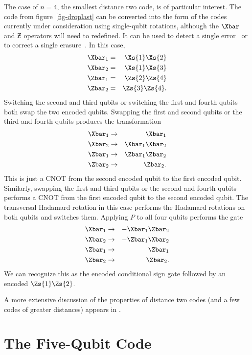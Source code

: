 The case of $n=4$, the smallest distance two code, is of particular interest.
The code from figure~\ref{fig-droplast} can be converted into the form of
the codes currently under consideration using single-qubit rotations,
although the $\Xbar$ and $\Zbar$ operators will need to redefined.  It
can be used to detect a single error~\cite{vaidman} or to correct a single
erasure~\cite{grassl}.  In this case,
\begin{eqnarray}
	\Xbar_1 & = & \Xs{1} \Xs{2} \nonumber \\
	\Xbar_2 & = & \Xs{1} \Xs{3} \nonumber \\
	\Zbar_1 & = & \Zs{2} \Zs{4} \\
	\Zbar_2 & = & \Zs{3} \Zs{4}. \nonumber
\end{eqnarray}
Switching the second and third qubits or switching the first and fourth qubits
both swap the two encoded qubits.  Swapping the first and second qubits or the
third and fourth qubits produces the transformation
\begin{eqnarray}
	\Xbar_1 & \rightarrow & \Xbar_1 \nonumber \\
	\Xbar_2 & \rightarrow & \Xbar_1 \Xbar_2 \nonumber \\
	\Zbar_1 & \rightarrow & \Zbar_1 \Zbar_2 \\
	\Zbar_2 & \rightarrow & \Zbar_2. \nonumber
\end{eqnarray}
This is just a CNOT from the second encoded qubit to the first encoded
qubit.  Similarly, swapping the first and third qubits or the second and fourth
qubits performs a CNOT from the first encoded qubit to the second encoded
qubit.  The transversal Hadamard rotation in this case performs the
Hadamard rotations on both qubits and switches them.  Applying $P$ to all
four qubits performs the gate
\begin{eqnarray}
	\Xbar_1 & \rightarrow & - \Xbar_1 \Zbar_2 \nonumber \\
	\Xbar_2 & \rightarrow & - \Zbar_1 \Xbar_2 \nonumber \\
	\Zbar_1 & \rightarrow & \Zbar_1 \\
	\Zbar_2 & \rightarrow & \Zbar_2. \nonumber
\end{eqnarray}
We can recognize this as the encoded conditional sign gate followed by an
encoded $\Zs{1} \Zs{2}$.

A more extensive discussion of the properties of distance two codes (and a
few codes of greater distances) appears in \cite{rains-dist2}.

\section{The Five-Qubit Code}

